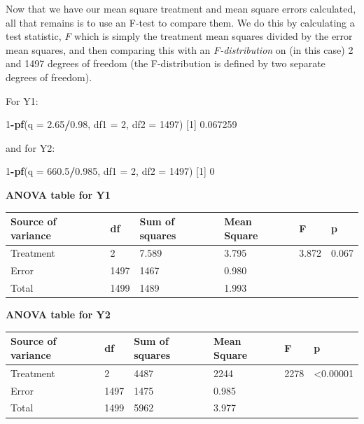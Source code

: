 \documentclass[
]{book}
\newenvironment{Shaded}{\begin{snugshade}}{\end{snugshade}}
\newcommand{\DataTypeTok}[1]{\textcolor[rgb]{0.13,0.29,0.53}{#1}}
\newcommand{\DecValTok}[1]{\textcolor[rgb]{0.00,0.00,0.81}{#1}}
\newcommand{\FloatTok}[1]{\textcolor[rgb]{0.00,0.00,0.81}{#1}}
\newcommand{\KeywordTok}[1]{\textcolor[rgb]{0.13,0.29,0.53}{\textbf{#1}}}
\newcommand{\NormalTok}[1]{#1}
\newcommand{\OperatorTok}[1]{\textcolor[rgb]{0.81,0.36,0.00}{\textbf{#1}}}
\begin{document}
Now that we have our mean square treatment and mean square errors calculated, all that remains is to use an F-test to compare them. We do this by calculating a test statistic, \emph{F} which is simply the treatment mean squares divided by the error mean squares, and then comparing this with an \emph{F-distribution} on (in this case) 2 and 1497 degrees of freedom (the F-distribution is defined by two separate degrees of freedom).

For Y1:

\begin{Shaded}
\begin{Highlighting}[]
\DecValTok{1}\OperatorTok{-}\KeywordTok{pf}\NormalTok{(}\DataTypeTok{q =} \FloatTok{2.65}\OperatorTok{/}\FloatTok{0.98}\NormalTok{, }\DataTypeTok{df1 =} \DecValTok{2}\NormalTok{, }\DataTypeTok{df2 =} \DecValTok{1497}\NormalTok{)}
\NormalTok{[}\DecValTok{1}\NormalTok{] }\FloatTok{0.067259}
\end{Highlighting}
\end{Shaded}

and for Y2:

\begin{Shaded}
\begin{Highlighting}[]
\DecValTok{1}\OperatorTok{-}\KeywordTok{pf}\NormalTok{(}\DataTypeTok{q =} \FloatTok{660.5}\OperatorTok{/}\FloatTok{0.985}\NormalTok{, }\DataTypeTok{df1 =} \DecValTok{2}\NormalTok{, }\DataTypeTok{df2 =} \DecValTok{1497}\NormalTok{)}
\NormalTok{[}\DecValTok{1}\NormalTok{] }\DecValTok{0}
\end{Highlighting}
\end{Shaded}

\textbf{ANOVA table for Y1}

\begin{longtable}[]{@{}llllll@{}}
\toprule
Source of variance & df & Sum of squares & Mean Square & F & p\tabularnewline
\midrule
\endhead
Treatment & 2 & 7.589 & 3.795 & 3.872 & 0.067\tabularnewline
Error & 1497 & 1467 & 0.980 & &\tabularnewline
Total & 1499 & 1489 & 1.993 & &\tabularnewline
\bottomrule
\end{longtable}

\textbf{ANOVA table for Y2}

\begin{longtable}[]{@{}llllll@{}}
\toprule
Source of variance & df & Sum of squares & Mean Square & F & p\tabularnewline
\midrule
\endhead
Treatment & 2 & 4487 & 2244 & 2278 & \textless0.00001\tabularnewline
Error & 1497 & 1475 & 0.985 & &\tabularnewline
Total & 1499 & 5962 & 3.977 & &\tabularnewline
\bottomrule
\end{longtable}
\end{document}
